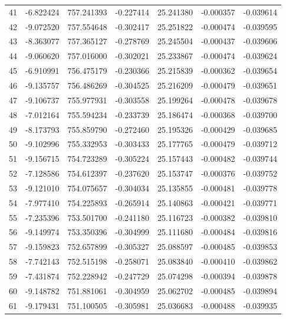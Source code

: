 \begin{tabular}{rrrrrrr}
  41 &  -6.822424 &  757.241393 & -0.227414 &   25.241380 &   -0.000357 & -0.039614 \\
  42 &  -9.072520 &  757.554648 & -0.302417 &   25.251822 &   -0.000474 & -0.039595 \\
  43 &  -8.363077 &  757.365127 & -0.278769 &   25.245504 &   -0.000437 & -0.039606 \\
  44 &  -9.060620 &  757.016000 & -0.302021 &   25.233867 &   -0.000474 & -0.039624 \\
  45 &  -6.910991 &  756.475179 & -0.230366 &   25.215839 &   -0.000362 & -0.039654 \\
  46 &  -9.135757 &  756.486269 & -0.304525 &   25.216209 &   -0.000479 & -0.039651 \\
  47 &  -9.106737 &  755.977931 & -0.303558 &   25.199264 &   -0.000478 & -0.039678 \\
  48 &  -7.012164 &  755.594234 & -0.233739 &   25.186474 &   -0.000368 & -0.039700 \\
  49 &  -8.173793 &  755.859790 & -0.272460 &   25.195326 &   -0.000429 & -0.039685 \\
  50 &  -9.102996 &  755.332953 & -0.303433 &   25.177765 &   -0.000479 & -0.039712 \\
  51 &  -9.156715 &  754.723289 & -0.305224 &   25.157443 &   -0.000482 & -0.039744 \\
  52 &  -7.128586 &  754.612397 & -0.237620 &   25.153747 &   -0.000376 & -0.039752 \\
  53 &  -9.121010 &  754.075657 & -0.304034 &   25.135855 &   -0.000481 & -0.039778 \\
  54 &  -7.977410 &  754.225893 & -0.265914 &   25.140863 &   -0.000421 & -0.039771 \\
  55 &  -7.235396 &  753.501700 & -0.241180 &   25.116723 &   -0.000382 & -0.039810 \\
  56 &  -9.149974 &  753.350396 & -0.304999 &   25.111680 &   -0.000484 & -0.039816 \\
  57 &  -9.159823 &  752.657899 & -0.305327 &   25.088597 &   -0.000485 & -0.039853 \\
  58 &  -7.742143 &  752.515198 & -0.258071 &   25.083840 &   -0.000410 & -0.039862 \\
  59 &  -7.431874 &  752.228942 & -0.247729 &   25.074298 &   -0.000394 & -0.039878 \\
  60 &  -9.148782 &  751.881061 & -0.304959 &   25.062702 &   -0.000485 & -0.039894 \\
  61 &  -9.179431 &  751.100505 & -0.305981 &   25.036683 &   -0.000488 & -0.039935 \\

\end{tabular}
